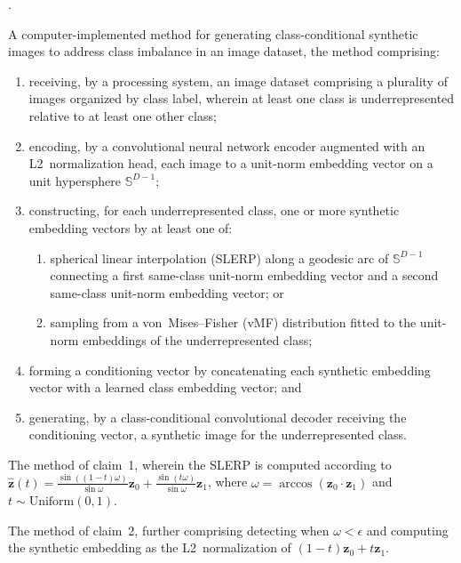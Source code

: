 \documentclass[12pt,letterpaper]{article}
\newcommand{\bz}{\mathbf{z}}
\newcommand{\Sphere}{\mathbb{S}}
\newcounter{claimnum}
\newenvironment{claims}{%
  \setcounter{claimnum}{0}
  \begin{list}{\arabic{claimnum}.}{%
    \usecounter{claimnum}
    \setlength{\leftmargin}{2em}
    \setlength{\labelsep}{0.5em}
    \setlength{\itemsep}{0pt}
    \setlength{\parsep}{6pt plus 2pt}
  }%
}{\end{list}}
\begin{document}
\begin{claims}


\item A computer-implemented method for generating class-conditional synthetic
images to address class imbalance in an image dataset, the method comprising:
\begin{enumerate}[label=(\alph*),leftmargin=1.5em,nosep]
  \item receiving, by a processing system, an image dataset comprising a
    plurality of images organized by class label, wherein at least one class
    is underrepresented relative to at least one other class;
  \item encoding, by a convolutional neural network encoder augmented with an
    L2~normalization head, each image to a unit-norm embedding vector on a
    unit hypersphere $\Sphere^{D-1}$;
  \item constructing, for each underrepresented class, one or more synthetic
    embedding vectors by at least one of:
    \begin{enumerate}[label=(\roman*),nosep]
      \item spherical linear interpolation (SLERP) along a geodesic arc of
        $\Sphere^{D-1}$ connecting a first same-class unit-norm embedding
        vector and a second same-class unit-norm embedding vector; or
      \item sampling from a von~Mises--Fisher (vMF) distribution fitted to
        the unit-norm embeddings of the underrepresented class;
    \end{enumerate}
  \item forming a conditioning vector by concatenating each synthetic
    embedding vector with a learned class embedding vector; and
  \item generating, by a class-conditional convolutional decoder receiving
    the conditioning vector, a synthetic image for the underrepresented class.
\end{enumerate}

\item The method of claim~1, wherein the SLERP is computed according to
$\hat{\bz}(t) = \frac{\sin((1-t)\omega)}{\sin\omega}\bz_0 +
\frac{\sin(t\omega)}{\sin\omega}\bz_1$, where $\omega =
\arccos(\bz_0 \cdot \bz_1)$ and $t \sim \text{Uniform}(0,1)$.

\item The method of claim~2, further comprising detecting when $\omega <
\epsilon$ and computing the synthetic embedding as the L2~normalization of
$(1-t)\bz_0 + t\bz_1$.


\end{claims}
\end{document}
